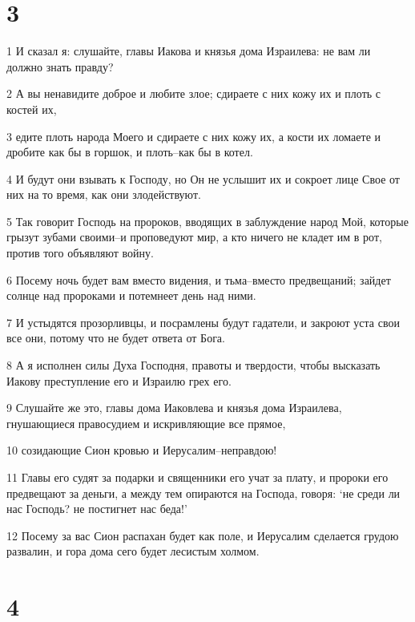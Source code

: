 \chapter{3}

\par 1 И сказал я: слушайте, главы Иакова и князья дома Израилева: не вам ли должно знать правду?
\par 2 А вы ненавидите доброе и любите злое; сдираете с них кожу их и плоть с костей их,
\par 3 едите плоть народа Моего и сдираете с них кожу их, а кости их ломаете и дробите как бы в горшок, и плоть--как бы в котел.
\par 4 И будут они взывать к Господу, но Он не услышит их и сокроет лице Свое от них на то время, как они злодействуют.
\par 5 Так говорит Господь на пророков, вводящих в заблуждение народ Мой, которые грызут зубами своими--и проповедуют мир, а кто ничего не кладет им в рот, против того объявляют войну.
\par 6 Посему ночь будет вам вместо видения, и тьма--вместо предвещаний; зайдет солнце над пророками и потемнеет день над ними.
\par 7 И устыдятся прозорливцы, и посрамлены будут гадатели, и закроют уста свои все они, потому что не будет ответа от Бога.
\par 8 А я исполнен силы Духа Господня, правоты и твердости, чтобы высказать Иакову преступление его и Израилю грех его.
\par 9 Слушайте же это, главы дома Иаковлева и князья дома Израилева, гнушающиеся правосудием и искривляющие все прямое,
\par 10 созидающие Сион кровью и Иерусалим--неправдою!
\par 11 Главы его судят за подарки и священники его учат за плату, и пророки его предвещают за деньги, а между тем опираются на Господа, говоря: `не среди ли нас Господь? не постигнет нас беда!'
\par 12 Посему за вас Сион распахан будет как поле, и Иерусалим сделается грудою развалин, и гора дома сего будет лесистым холмом.

\chapter{4}

